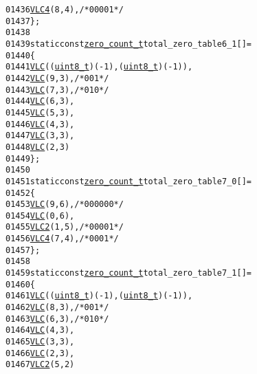 \begin{footnotesize}
\begin{alltt}
01436         \hyperlink{vlc_8h_a02cdc921d8f03450b12879e8afb222cb}{VLC4}(8, 4),\textcolor{comment}{/* 0000 1 */}
01437 \};
01438 
01439 \textcolor{keyword}{static} \textcolor{keyword}{const} \hyperlink{structzero__count__t}{zero_count_t} total\_zero\_table6\_1[] = 
01440 \{
01441         \hyperlink{vlc_8h_a7f3572774a720fd9b4bc3b1a0b65082f}{VLC}((\hyperlink{_types_8h_a363e4d606232036a6b89060813c45489}{uint8_t})(-1), (\hyperlink{_types_8h_a363e4d606232036a6b89060813c45489}{uint8_t})(-1)),
01442         \hyperlink{vlc_8h_a7f3572774a720fd9b4bc3b1a0b65082f}{VLC}(9, 3), \textcolor{comment}{/* 001 */}
01443         \hyperlink{vlc_8h_a7f3572774a720fd9b4bc3b1a0b65082f}{VLC}(7, 3), \textcolor{comment}{/* 010 */}
01444         \hyperlink{vlc_8h_a7f3572774a720fd9b4bc3b1a0b65082f}{VLC}(6, 3),
01445         \hyperlink{vlc_8h_a7f3572774a720fd9b4bc3b1a0b65082f}{VLC}(5, 3),
01446         \hyperlink{vlc_8h_a7f3572774a720fd9b4bc3b1a0b65082f}{VLC}(4, 3),
01447         \hyperlink{vlc_8h_a7f3572774a720fd9b4bc3b1a0b65082f}{VLC}(3, 3),
01448         \hyperlink{vlc_8h_a7f3572774a720fd9b4bc3b1a0b65082f}{VLC}(2, 3)
01449 \};
01450 
01451 \textcolor{keyword}{static} \textcolor{keyword}{const} \hyperlink{structzero__count__t}{zero_count_t} total\_zero\_table7\_0[] = 
01452 \{
01453         \hyperlink{vlc_8h_a7f3572774a720fd9b4bc3b1a0b65082f}{VLC}(9, 6), \textcolor{comment}{/* 0000 00 */}
01454         \hyperlink{vlc_8h_a7f3572774a720fd9b4bc3b1a0b65082f}{VLC}(0, 6),
01455         \hyperlink{vlc_8h_ad3cda36b9c6132357c7f7de5e52a6c93}{VLC2}(1, 5),\textcolor{comment}{/* 0000 1 */}
01456         \hyperlink{vlc_8h_a02cdc921d8f03450b12879e8afb222cb}{VLC4}(7, 4),\textcolor{comment}{/* 0001 */}
01457 \};
01458 
01459 \textcolor{keyword}{static} \textcolor{keyword}{const} \hyperlink{structzero__count__t}{zero_count_t} total\_zero\_table7\_1[] = 
01460 \{
01461         \hyperlink{vlc_8h_a7f3572774a720fd9b4bc3b1a0b65082f}{VLC}((\hyperlink{_types_8h_a363e4d606232036a6b89060813c45489}{uint8_t})(-1), (\hyperlink{_types_8h_a363e4d606232036a6b89060813c45489}{uint8_t})(-1)),
01462         \hyperlink{vlc_8h_a7f3572774a720fd9b4bc3b1a0b65082f}{VLC}(8, 3), \textcolor{comment}{/* 001 */}
01463         \hyperlink{vlc_8h_a7f3572774a720fd9b4bc3b1a0b65082f}{VLC}(6, 3), \textcolor{comment}{/* 010 */}
01464         \hyperlink{vlc_8h_a7f3572774a720fd9b4bc3b1a0b65082f}{VLC}(4, 3),
01465         \hyperlink{vlc_8h_a7f3572774a720fd9b4bc3b1a0b65082f}{VLC}(3, 3),
01466         \hyperlink{vlc_8h_a7f3572774a720fd9b4bc3b1a0b65082f}{VLC}(2, 3),
01467         \hyperlink{vlc_8h_ad3cda36b9c6132357c7f7de5e52a6c93}{VLC2}(5, 2)

\end{alltt}
\end{footnotesize}
